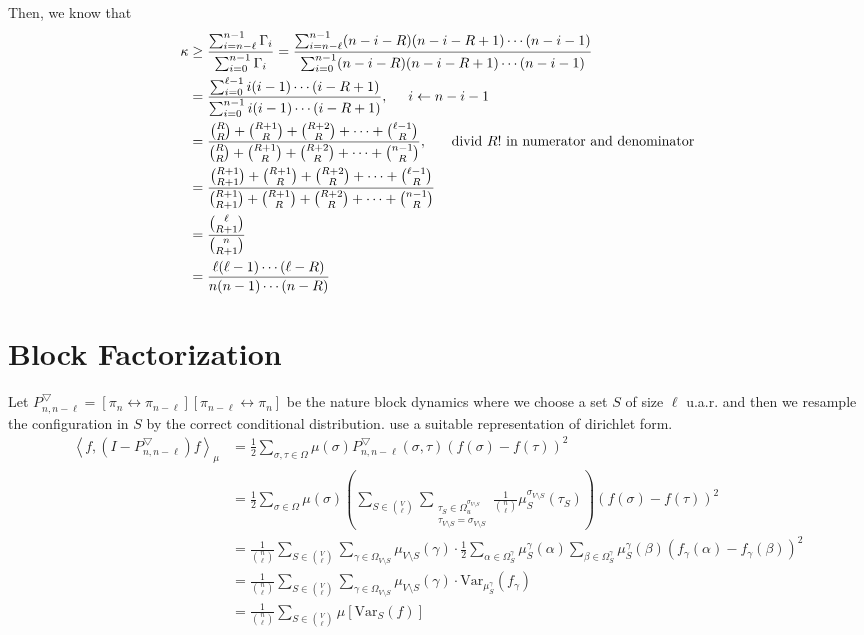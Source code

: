 \documentclass{article}
\def\Op#1#2{\left[#1 \leftrightarrow #2\right]}
\def\Var{\mathrm{Var}}
\def\<{\left\langle}
\def\>{\right\rangle}
\begin{document}
Then, we know that
\begin{align*}
  \kappa &\geq \frac{\sum_{i=n-\ell}^{n-1}\Gamma_i}{\sum_{i=0}^{n-1}\Gamma_i} = \frac{\sum_{i=n-\ell}^{n-1}(n-i-R)(n-i-R+1)\cdots(n-i-1)}{\sum_{i=0}^{n-1}(n-i-R)(n-i-R+1)\cdots(n-i-1)} \\
         &= \frac{\sum_{i=0}^{\ell-1}i(i-1)\cdots(i-R+1)}{\sum_{i=0}^{n-1}i(i-1)\cdots(i-R+1)}, \hspace{0.5cm} i\gets n - i - 1 \\
         &= \frac{\binom{R}{R} + \binom{R+1}{R} + \binom{R+2}{R} + \cdots + \binom{\ell-1}{R}}{\binom{R}{R} + \binom{R+1}{R} + \binom{R+2}{R} + \cdots + \binom{n-1}{R}} ,\hspace{0.5cm} \mbox{ divid $R!$ in numerator and denominator} \\
         &= \frac{\binom{R+1}{R+1} + \binom{R+1}{R} + \binom{R+2}{R} + \cdots + \binom{\ell-1}{R}}{\binom{R+1}{R+1} + \binom{R+1}{R} + \binom{R+2}{R} + \cdots + \binom{n-1}{R}} \\
         &=\frac{\binom{\ell}{R+1}}{\binom{n}{R+1}} \\
         &=\frac{\ell(\ell-1)\cdots(\ell-R)}{n(n-1)\cdots(n-R)} \\
\end{align*}

\section{Block Factorization}

Let $P^{\bigtriangledown}_{n,n-\ell} = \Op{\pi_n}{\pi_{n-\ell}}\Op{\pi_{n-\ell}}{\pi_n}$ be the nature block dynamics where we choose a set $S$ of size $\ell$ u.a.r. and then we resample the configuration in $S$ by the correct conditional distribution.
\cite{CLV20-1} use a suitable representation of dirichlet form.
\begin{align*}
  \<f, (I - P^{\bigtriangledown}_{n,n-\ell})f\>_\mu
  &= \frac{1}{2} \sum_{\sigma, \tau \in\Omega} \mu(\sigma)P^\bigtriangledown_{n,n-\ell}(\sigma, \tau)\left(f(\sigma) - f(\tau)\right)^2 \\
  &= \frac{1}{2} \sum_{\sigma\in\Omega} \mu(\sigma) \left(\sum_{S \in \binom{V}{\ell}} \sum_{\substack{\tau_S\in\Omega^{\sigma_{V\setminus S}}_u \\ \tau_{V\setminus S} = \sigma_{V\setminus S}}} \frac{1}{\binom{n}{\ell}} \mu^{\sigma_{V\setminus S}}_S(\tau_S)\right)\left(f(\sigma) - f(\tau)\right)^2 \\
  &= \frac{1}{\binom{n}{\ell}} \sum_{S\in \binom{V}{\ell}} \sum_{\gamma\in \Omega_{V\setminus S}} \mu_{V\setminus S} (\gamma) \cdot \frac{1}{2} \sum_{\alpha\in \Omega^{\gamma}_S} \mu^\gamma_S(\alpha) \sum_{\beta\in\Omega^\gamma_S}\mu^\gamma_S(\beta) (f_\gamma(\alpha) - f_\gamma(\beta))^2 \\
  &= \frac{1}{\binom{n}{\ell}}\sum_{S\in \binom{V}{\ell}} \sum_{\gamma\in\Omega_{V\setminus S}} \mu_{V\setminus S}(\gamma) \cdot \Var_{\mu^\gamma_S} (f_\gamma) \\
  &= \frac{1}{\binom{n}{\ell}} \sum_{S\in \binom{V}{\ell}} \mu\left[\Var_S(f)\right]
\end{align*}
\end{document}
